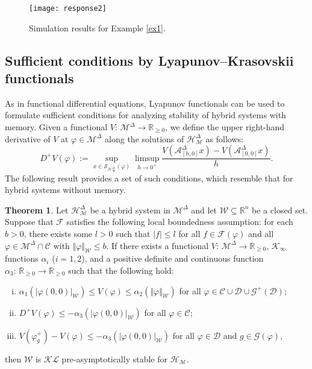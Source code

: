 \documentclass[journal,final,twocolumn]{IEEEtran}
\theoremstyle{definition}
\newtheorem{thm}{Theorem}
\begin{document}
\begin{figure}[ht!]
\centering
    \texttt{[image: response2]}
  \caption{Simulation results for Example \ref{ex1}.}\label{fig:sample}
\end{figure}

\subsection{Sufficient conditions by Lyapunov--Krasovskii functionals}

As in functional differential equations, Lyapunov functionals can be used to formulate sufficient conditions for analyzing stability of hybrid systems with memory. Given a functional $V:\,{\mathcal{M}^{\Delta}}{\rightarrow}{\mathbb R}_{\ge 0}$, we define the upper right-hand derivative of $V$ at ${\varphi}\in{\mathcal{M}^{\Delta}}$ along the solutions of ${\mathcal{H}_{\mathcal{M}}^{\Delta}}$ as follows:
\begin{equation*}
D^+V({\varphi}):=\sup_{x\in{\mathcal{S}_{\mathcal{H}_\mathcal{M}^{\Delta}}}({\varphi})}\limsup_{h\rightarrow 0^+}\frac{V(\mathcal{A}_{[h,0]}^{\Delta}x)-V(\mathcal{A}_{[0,0]}^{\Delta}x)}{h}.
\end{equation*} 
The following result provides a set of such conditions, which resemble that for hybrid systems without memory. 

\begin{thm}
\label{jlthm:LK}
Let ${\mathcal{H}_{\mathcal{M}}^{\Delta}}$ be a hybrid system in ${\mathcal{M}}^{\Delta}$ and let ${\mathcal{W}}{\subseteq}{\mathbb R}^n$ be a closed set. Suppose that ${\mathcal{F}}$ satisfies the following local boundedness assumption: for each $b>0$, there exists some $l>0$ such that ${\left\vert{f}\right\vert}\le l$ for all $f\in {\mathcal{F}}({\varphi})$ and all ${\varphi}\in{\mathcal{M}^{\Delta}}\cap {\mathcal{C}}$ with ${\Vert{\varphi}\Vert}_{\mathcal{W}}\le b$. If there exists a functional $V:\,{\mathcal{M}^{\Delta}}{\rightarrow}{\mathbb R}_{\ge 0}$, ${\mathcal{K}}_\infty$ functions $\alpha_i$ ($i=1,2$), and a positive definite and continuous function $\alpha_3:\,{\mathbb R}_{\ge 0}{\rightarrow}{\mathbb R}_{\ge 0}$ such that the following hold:
\begin{enumerate}[(i)]
\item $\alpha_1({\left\vert{{\varphi}(0,0)}\right\vert}_{\mathcal{W}})\le V({\varphi})\le \alpha_2({\Vert{\varphi}\Vert}_{\mathcal{W}})$ for all ${\varphi}\in {\mathcal{C}}\cup {\mathcal{D}}\cup{\mathcal{G}}^+({\mathcal{D}})$;
\item $D^+V({\varphi})\le -\alpha_3({\left\vert{{\varphi}(0,0)}\right\vert}_{\mathcal{W}})$ for all ${\varphi}\in {\mathcal{C}}$;
\item $V({\varphi}_g^+)-V({\varphi})\le -\alpha_3({\left\vert{{\varphi}(0,0)}\right\vert}_{\mathcal{W}})$ for all ${\varphi}\in{\mathcal{D}}$ and $g\in{\mathcal{G}}({\varphi})$, \end{enumerate}
then ${\mathcal{W}}$ is ${\mathcal{KL}}$ pre-asymptotically stable for ${\mathcal{H_M}}$.
\end{thm}
\end{document}
